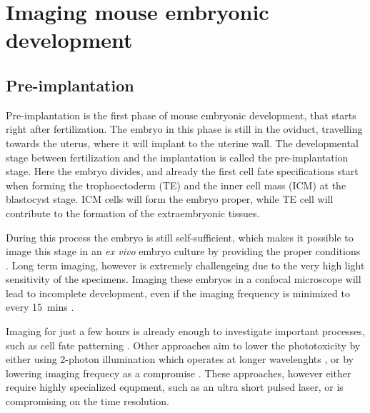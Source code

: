   



\section{Imaging mouse embryonic development}

  \subsection{Pre-implantation}

    Pre-implantation is the first phase of mouse embryonic development, that starts right after fertilization. The embryo in this phase is still in the oviduct, travelling towards the uterus, where it will implant to the uterine wall. The developmental stage between fertilization and the implantation is called the pre-implantation stage. Here the embryo divides, and already the first cell fate specifications start when forming the trophoectoderm (TE) and the inner cell mass (ICM) at the blastocyst stage. ICM cells will form the embryo proper, while TE cell will contribute to the formation of the extraembryonic tissues.
    
    During this process the embryo is still self-sufficient, which makes it possible to image this stage in an \textit{ex vivo} embryo culture by providing the proper conditions \cite{doherty_culture_2000}. Long term imaging, however is extremely challengeing due to the very high light sensitivity of the specimens. Imaging these embryos in a confocal microscope will lead to incomplete development, even if the imaging frequency is minimized to every \SI{15}{mins} \cite{strnad_inverted_2016}.

    Imaging for just a few hours is already enough to investigate important processes, such as cell fate patterning \cite{dietrich_stochastic_2007}. Other approaches aim to lower the phototoxicity by either using 2-photon illumination which operates at longer wavelenghts \cite{denk_two-photon_1990,squirrell_long-term_1999,mcdole_lineage_2011}, or by lowering imaging frequecy as a compromise \cite{yamagata_long-term_2009}. These approaches, however either require highly specialized equpment, such as an ultra short pulsed laser, or is compromising on the time resolution.

